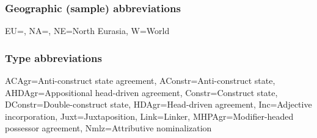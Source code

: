 \subsubsection{Geographic (sample) abbreviations}
\begin{flushleft}
EU=, NA=, NE=North Eurasia, W=World
\end{flushleft}


\subsubsection{Type abbreviations}
\begin{flushleft}
ACAgr=Anti\hyp{}construct state agreement, AConstr=Anti\hyp{}construct state, AHDAgr=Appositional head\hyp{}driven agreement, Constr=Construct state, DConstr=Double\hyp{}construct state, HDAgr=Head\hyp{}driven agreement, Inc=Adjective incorporation, Juxt=Juxtaposition, Link=Linker, MHPAgr=Modifier\hyp{}headed possessor agreement, Nmlz=Attributive nominalization
\end{flushleft}

